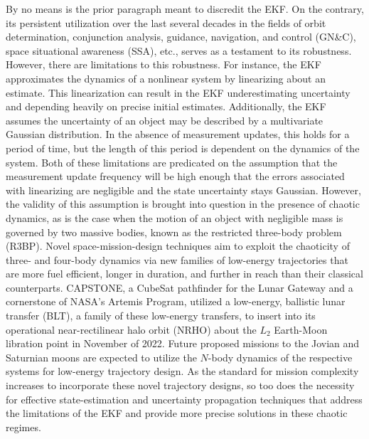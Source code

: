 \documentclass[paper,11pt]{AAS}
\begin{document}
By no means is the prior paragraph meant to discredit the EKF. On the contrary, its persistent utilization over the last several decades in the fields of orbit determination, conjunction analysis, guidance, navigation, and control (GN\&C), space situational awareness (SSA), etc., serves as a testament to its robustness. However, there are limitations to this robustness. For instance, the EKF approximates the dynamics of a nonlinear system by linearizing about an estimate. This linearization can result in the EKF underestimating uncertainty and depending heavily on precise initial estimates. Additionally, the EKF assumes the uncertainty of an object may be described by a multivariate Gaussian distribution. In the absence of measurement updates, this holds for a period of time, but the length of this period is dependent on the dynamics of the system. Both of these limitations are predicated on the assumption that the measurement update frequency will be high enough that the errors associated with linearizing are negligible and the state uncertainty stays Gaussian. However, the validity of this assumption is brought into question in the presence of chaotic dynamics, as is the case when the motion of an object with negligible mass is governed by two massive bodies, known as the restricted three-body problem (R3BP)\cite{jG97}. Novel space-mission-design techniques aim to exploit the chaoticity of three- and four-body dynamics via new families of low-energy trajectories that are more fuel efficient, longer in duration, and further in reach than their classical counterparts\cite{sR22}. CAPSTONE, a CubeSat pathfinder for the Lunar Gateway and a cornerstone of NASA's Artemis Program, utilized a low-energy, ballistic lunar transfer\cite{parker_thesis} (BLT), a family of these low-energy transfers, to insert into its operational near-rectilinear halo orbit (NRHO) about the $L_2$ Earth-Moon libration point in November of 2022\cite{mT21}. Future proposed missions to the Jovian and Saturnian moons \cite{sR22, sC13} are expected to utilize the $N$-body dynamics of the respective systems for low-energy trajectory design. As the standard for mission complexity increases to incorporate these novel trajectory designs, so too does the necessity for effective state-estimation and uncertainty propagation techniques that address the limitations of the EKF and provide more precise solutions in these chaotic regimes. 
\end{document}

